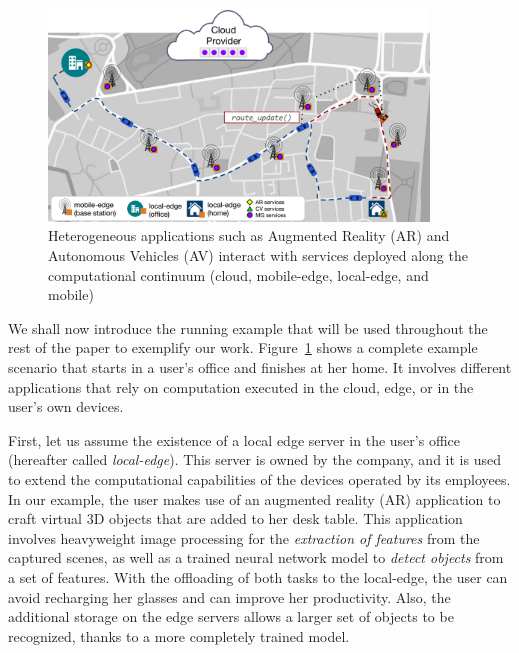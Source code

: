 \begin{figure}[tbp]
	\includegraphics[width=0.9\textwidth]{figs/Continuum-Scenario}
	\caption{Heterogeneous applications such as Augmented Reality (AR) and Autonomous Vehicles (AV) interact with services deployed along the computational continuum (cloud, mobile-edge, local-edge, and mobile)}
	\label{fig:continuum-scenario}
\end{figure}

We shall now introduce the running example that will be used throughout the rest of the paper to exemplify our work. Figure~\ref{fig:continuum-scenario} shows a complete example scenario that starts in a user's office and finishes at her home. It involves different applications that rely on computation executed in the cloud, edge, or in the user's own devices. 

First, let us assume the existence of a local edge server in the user's office (hereafter called \textit{local-edge}). This server is owned by the company, and it is used to extend the computational capabilities of the devices operated by its employees. In our example, the user makes use of an augmented reality (AR) application to craft virtual 3D objects that are added to her desk table. This application involves heavyweight image processing for the \textit{extraction of features} from the captured scenes, as well as a trained neural network model to \textit{detect objects} from a set of features. With the offloading of both tasks to the local-edge, the user can avoid recharging her glasses and can improve her productivity. Also, the additional storage on the edge servers allows a larger set of objects to be recognized, thanks to a more completely trained model.

